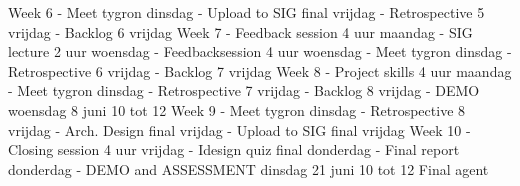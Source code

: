 Week 6\newline
-          Meet tygron dinsdag\newline
-          Upload to SIG final vrijdag\newline
-          Retrospective 5 vrijdag\newline
-          Backlog 6 vrijdag\newline
\newline
Week 7\newline
-          Feedback session 4 uur maandag\newline
-          SIG lecture 2 uur woensdag\newline
-          Feedbacksession 4 uur woensdag\newline
\newline
-          Meet tygron dinsdag\newline
-          Retrospective 6 vrijdag\newline
-          Backlog 7 vrijdag\newline
\newline
Week 8\newline
-          Project skills 4 uur maandag\newline
\newline
-          Meet tygron dinsdag\newline
-          Retrospective 7 vrijdag\newline
-          Backlog 8 vrijdag\newline
\newline
-          DEMO woensdag 8 juni 10 tot 12\newline
Week 9\newline
-          Meet tygron dinsdag\newline
-          Retrospective 8 vrijdag\newline
-          Arch. Design final vrijdag\newline
-          Upload to SIG final vrijdag\newline
\newline
Week 10\newline
-          Closing session 4 uur vrijdag\newline
\newline
-          Idesign quiz final donderdag\newline
-          Final report donderdag\newline
\newline
-          DEMO and ASSESSMENT dinsdag 21 juni 10 tot 12 Final agent\newline
